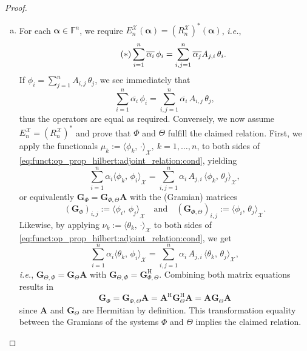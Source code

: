 \documentclass[a4paper]{paper}
\newcommand{\Spc}[1]{\mathscr{#1}}
\newcommand{\Field}{\mathbb{F}}
\newcommand*{\EXT}[2]{\ensuremath{E_{#1}^{#2}}}
\newcommand*{\REST}[2]{\ensuremath{R_{#1}^{#2}}}
\newcommand*{\RnX}{\ensuremath{\REST{n}{\Spc{X}}}}
\newcommand*{\EnX}{\ensuremath{\EXT{n}{\Spc{X}}}}
\newcommand*{\INNER}[2]{\ensuremath{\langle #1,\,#2\rangle}}
\newcommand*{\HERM}[1]{{\ensuremath{#1^{\mathrm{H}}}}}
\newcommand{\ie}{\textsl{i.e.}\xspace}
\newcommand{\valpha}{\boldsymbol{\alpha}}
\newcommand{\vA}{\boldsymbol{A}}
\newcommand{\vG}{\boldsymbol{G}}
\begin{document}
\begin{proof}
\begin{enumerate}[(a)]
  \item For each $\valpha \in \Field^n$, we require $\EnX(\valpha) = (\RnX)^*(\valpha)$, \ie,
  \begin{equation}
   \label{eq:funct:op_prop_hilbert:adjoint_relation:cond}
   \tag{{$\ast$}}
   \sum_{i=1}^n \overline{\alpha_i}\, \phi_i = \sum_{i,j=1}^n \overline{\alpha_j} A_{j,i}\, \theta_i.
  \end{equation}
  If $\phi_i = \sum_{j=1}^n A_{i,j}\, \theta_j$, we see immediately that
  \begin{equation*}
   \sum_{i=1}^n \overline{\alpha_i}\, \phi_i = \sum_{i,j=1}^n \overline{\alpha_i}\, A_{i,j}\, \theta_j,
  \end{equation*}
  thus the operators are equal as required. Conversely, we now assume $\EnX = (\RnX)^*$ and prove that $\Phi$ and 
  $\Theta$ fulfill the claimed relation. First, we apply the functionals 
  $\mu_k := \INNER{\phi_k}{\cdot}_{\Spc{X}},\ k=1,\ldots,n$, to both sides of 
  \eqref{eq:funct:op_prop_hilbert:adjoint_relation:cond}, yielding
  \begin{equation*}
   \sum_{i=1}^n \alpha_i \INNER{\phi_k}{\phi_i}_{\Spc{X}} = \sum_{i,j=1}^n \alpha_i\, A_{j,i}\, 
   \INNER{\phi_k}{\theta_j}_{\Spc{X}},
  \end{equation*}
  or equivalently $\vG_{\Phi} = \vG_{\Phi,\Theta} \vA$ with the (Gramian) matrices
  \begin{equation*}
   (\vG_{\Phi})_{i,j} := \INNER{\phi_i}{\phi_j}_{\Spc{X}}
   \quad \text{and} \quad
   (\vG_{\Phi, \Theta})_{i,j} := \INNER{\phi_i}{\theta_j}_{\Spc{X}}.
  \end{equation*}
  Likewise, by applying $\nu_k := \INNER{\theta_k}{\cdot}_{\Spc{X}}$ to both sides of 
  \eqref{eq:funct:op_prop_hilbert:adjoint_relation:cond}, we get
  \begin{equation*}
   \sum_{i=1}^n \alpha_i \INNER{\theta_k}{\phi_i}_{\Spc{X}} = \sum_{i,j=1}^n \alpha_i\, A_{j,i}\, 
   \INNER{\theta_k}{\theta_j}_{\Spc{X}},
  \end{equation*}
  \ie, $\vG_{\Theta,\Phi} = \vG_\Theta \vA$ with $\vG_{\Theta,\Phi} = \HERM{\vG_{\Phi,\Theta}}$. Combining both matrix 
  equations results in
  \begin{equation*}
   \vG_{\Phi} = \vG_{\Phi,\Theta} \vA = \HERM{\vA} \HERM{\vG_\Theta} \vA = \vA \vG_\Theta \vA
  \end{equation*}
  since $\vA$ and $\vG_\Theta$ are Hermitian by definition. This transformation equality between the Gramians of the 
  systems $\Phi$ and $\Theta$ implies the claimed relation.
  

\end{enumerate}
\end{proof}
\end{document}
